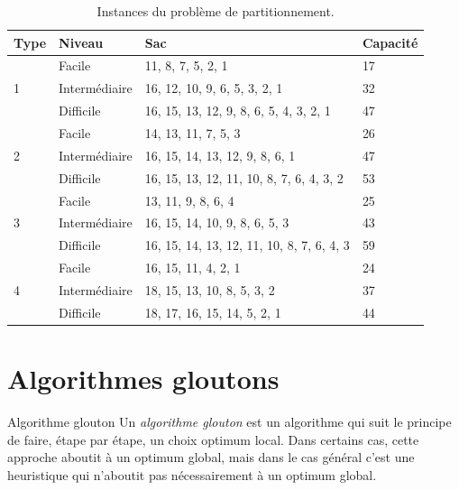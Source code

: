 \documentclass[11pt]{article}
\begin{document}
\begin{table}[htbp]
  \centering
      \begin{tabular}{llll}
      \toprule
      Type & Niveau & Sac & Capacité \\
      \midrule
             & Facile & 11, 8, 7, 5, 2, 1 & 17 \\
      1 & Intermédiaire & 16, 12, 10, 9, 6, 5, 3, 2, 1 & 32 \\
             & Difficile & 16, 15, 13, 12, 9, 8, 6, 5, 4, 3, 2, 1 & 47 \\
      \midrule
             & Facile & 14, 13, 11, 7, 5, 3 & 26 \\
      2 & Intermédiaire & 16, 15, 14, 13, 12, 9, 8, 6, 1 & 47 \\
             & Difficile & 16, 15, 13, 12, 11, 10, 8, 7, 6, 4, 3, 2 & 53 \\
      \midrule
             & Facile & 13, 11, 9, 8, 6, 4 & 25 \\
      3 & Intermédiaire & 16, 15, 14, 10, 9, 8, 6, 5, 3 & 43 \\
             & Difficile & 16, 15, 14, 13, 12, 11, 10, 8, 7, 6, 4, 3 & 59 \\
      \midrule
             & Facile & 16, 15, 11, 4, 2, 1 & 24 \\
      4 & Intermédiaire & 18, 15, 13, 10, 8, 5, 3, 2 & 37 \\
             & Difficile & 18, 17, 16, 15, 14, 5, 2, 1 & 44 \\
      \bottomrule
      \end{tabular}
  \caption{Instances du problème de partitionnement.}
  \label{tab:instances}
\end{table}

    \section{Algorithmes gloutons}

  \begin{definition}{Algorithme glouton}
    Un \emph{algorithme glouton} est un algorithme qui suit le principe de faire, étape par étape, un choix optimum local.
    Dans certains cas, cette approche aboutit à un optimum global, mais dans le cas général c'est une heuristique qui n'aboutit pas nécessairement à un optimum global.
  \end{definition}
\end{document}
